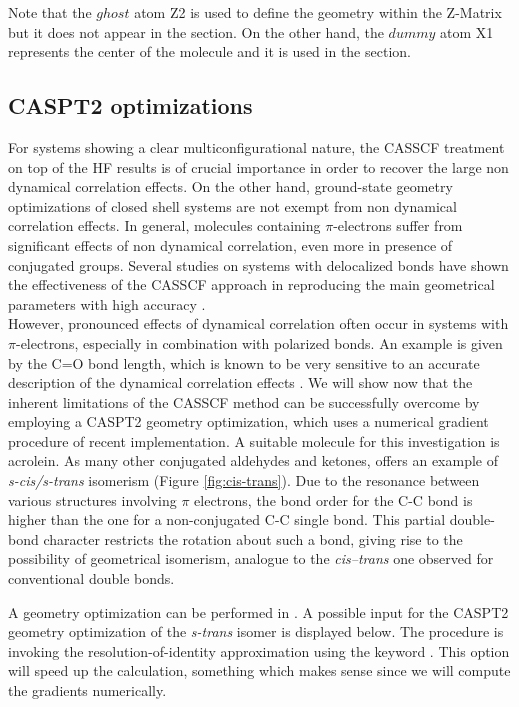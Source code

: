 Note that the $ghost$ atom Z2 is used to define the geometry within the Z-Matrix
but it does not appear in the  section. On the 
other hand, the $dummy$ atom X1 represents the center of the molecule and it
is used in the  section.

\subsection{CASPT2 optimizations}

For systems showing a clear multiconfigurational nature, the CASSCF
treatment on top of the HF results is of crucial importance in order to
recover the large non dynamical correlation effects.
On the other hand, ground-state geometry optimizations of closed
shell systems are not exempt from non dynamical correlation effects.
In general, molecules containing $\pi$-electrons suffer from significant
effects of non dynamical correlation, even more in presence of
conjugated groups. Several studies on systems with delocalized bonds
have shown the effectiveness of the CASSCF approach in reproducing
the main geometrical parameters with
high accuracy \cite{Serrano:93a,Serrano:96a,Page:99}. \\

However, pronounced effects of dynamical correlation often occur
in systems with $\pi$-electrons, especially in combination with polarized
bonds. An example is given by the  C=O bond length, which is known
to be very sensitive to an accurate
description of the dynamical correlation effects \cite{Pou:99}. We will show now
that the inherent limitations of the CASSCF method can be successfully overcome by employing
a CASPT2 geometry optimization, which uses a numerical gradient procedure
of recent implementation. A suitable molecule for this investigation
is acrolein.
As many other conjugated aldehydes and ketones, offers an example
of {\em s-cis/s-trans} isomerism (Figure \ref{fig:cis-trans}). Due to the resonance
between various structures
involving $\pi$ electrons,
the bond order for the C-C bond is higher than the one for a non-conjugated
C-C single bond. This partial double-bond character restricts the rotation
about such a bond, giving rise to the possibility of geometrical isomerism,
analogue to the {\em cis--trans} one observed for conventional double bonds.

A  geometry optimization can be performed in \molcas.
A possible input for the CASPT2 geometry optimization of the {\em s-trans}
isomer is displayed below. The procedure is invoking the resolution-of-identity
approximation using the keyword . This option will speed up the
calculation, something which makes sense since we will compute the gradients numerically.

